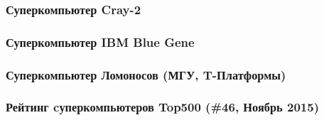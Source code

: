 \begin{frame}
\frametitle{Суперкомпьютер Cray-2}
\end{frame}

\begin{frame}
\frametitle{Суперкомпьютер IBM Blue Gene}
\end{frame}

\begin{frame}
\frametitle{Суперкомпьютер Ломоносов (МГУ, T-Платформы)}
\end{frame}

\begin{frame}
\frametitle{Рейтинг cуперкомпьютеров Top500 (\#46, Ноябрь 2015)}
\end{frame}



